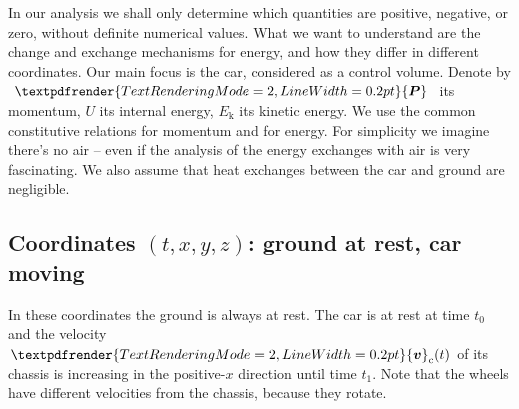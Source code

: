 \documentclass[a4paper,12pt,%
onecolumn,oneside,%
british%
]{memoir}
\providecommand{\href}[2]{#2}
\renewcommand*{\bm}[1]{\textpdfrender{TextRenderingMode=2,LineWidth=0.2pt}{\boldsymbol{#1}}}
\renewcommand*{\|}[1][]{\nonscript\:#1\vert\nonscript\:\mathopen{}}
\newcommand*{\sect}{\S}%
\newcommand*{\furl}[2]{\href{#1}{#2}\pagenote{\url{#1}}}
\renewcommand*{\autoref}[3][\sect\,\ref]{\textcolor{blue}{#3}
\raisebox{0.6ex}{\color{blue}\miniscule%
\faIcon{angle-right}%
\;#1{#2}\;p.\,\pageref{#2}}}
\newcommand*{\yv}{\bm{v}}
\newcommand*{\yti}{t_{0}}
\newcommand*{\ytf}{t_{1}}
\newcommand*{\yE}{E}
\newcommand*{\yU}{U}
\newcommand*{\yEk}{\yE_{\textrm{k}}}%
\newcommand*{\yP}{\bm{P}}
\begin{document}
In our analysis we shall only determine which quantities are positive, negative, or zero, without definite numerical values. What we want to understand are the change and exchange mechanisms for energy, and how they differ in different coordinates. Our main focus is the car, considered as a control volume. Denote by $\yP$ its momentum, $\yU$ its internal energy, $\yEk$ its kinetic energy. We use the common constitutive relations for momentum and for energy. For simplicity we imagine there's no air -- even if the analysis of the energy exchanges with air is very fascinating. We also assume that heat exchanges between the car and ground are negligible. %

\subsection{Coordinates $(t,x,y,z)$: ground at rest, car moving}
\label{sec:car_road_rest}

%
%
In these coordinates the ground is always at rest. The car is at rest at time $\yti$ and the velocity $\yv_{\text{c}}(t)$ of its chassis is increasing in the positive-$x$ direction until time $\ytf$. Note that the wheels have different velocities from the chassis, because they rotate.
\end{document}
